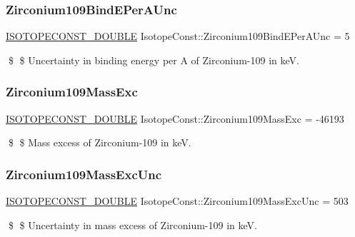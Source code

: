 \subsubsection{\texorpdfstring{Zirconium109\+Bind\+E\+Per\+A\+Unc}{Zirconium109BindEPerAUnc}}
{\footnotesize\ttfamily \mbox{\hyperlink{group___isotope_const-_macros_ga8f45a7272ce02c0b4c65c44636ed719a}{I\+S\+O\+T\+O\+P\+E\+C\+O\+N\+S\+T\+\_\+\+D\+O\+U\+B\+LE}} Isotope\+Const\+::\+Zirconium109\+Bind\+E\+Per\+A\+Unc = 5}

\$ \$ Uncertainty in binding energy per A of Zirconium-\/109 in keV. \mbox{\label{group___isotope_const-_zirconium-_zr109_ga26f4d1e30380e61b6cb1fde20cae9ee7}} 
\subsubsection{\texorpdfstring{Zirconium109\+Mass\+Exc}{Zirconium109MassExc}}
{\footnotesize\ttfamily \mbox{\hyperlink{group___isotope_const-_macros_ga8f45a7272ce02c0b4c65c44636ed719a}{I\+S\+O\+T\+O\+P\+E\+C\+O\+N\+S\+T\+\_\+\+D\+O\+U\+B\+LE}} Isotope\+Const\+::\+Zirconium109\+Mass\+Exc = -\/46193}

\$ \$ Mass excess of Zirconium-\/109 in keV. \mbox{\label{group___isotope_const-_zirconium-_zr109_gae4866869743d9446e1b2702011e84857}} 
\subsubsection{\texorpdfstring{Zirconium109\+Mass\+Exc\+Unc}{Zirconium109MassExcUnc}}
{\footnotesize\ttfamily \mbox{\hyperlink{group___isotope_const-_macros_ga8f45a7272ce02c0b4c65c44636ed719a}{I\+S\+O\+T\+O\+P\+E\+C\+O\+N\+S\+T\+\_\+\+D\+O\+U\+B\+LE}} Isotope\+Const\+::\+Zirconium109\+Mass\+Exc\+Unc = 503}

\$ \$ Uncertainty in mass excess of Zirconium-\/109 in keV. \mbox{\label{group___isotope_const-_zirconium-_zr109_ga3ad1ec719b632a1ab035f51791c89c6c}} 
